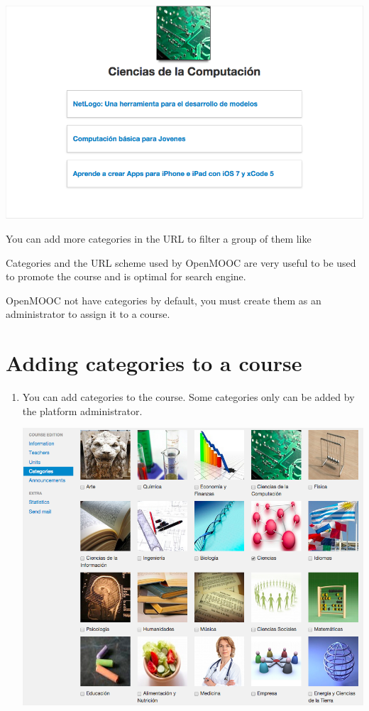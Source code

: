 \documentclass[letterpaper,10pt,english]{sphinxmanual}
\begin{document}

\includegraphics{5_categories-0a.png}

You can add more categories in the URL to filter a group of them like


Categories and the URL scheme used by OpenMOOC are very useful to be used to
promote the course and is optimal for search engine.

OpenMOOC not have categories by default, you must create them as an administrator to assign it to a course.


\section{Adding categories to a course}
\label{categories:adding-categories-to-a-course}\begin{enumerate}
\item {} 
You can add categories to the course. Some categories only can be added by the platform administrator.

\includegraphics{5_categories-1.png}

\end{enumerate}
\end{document}

